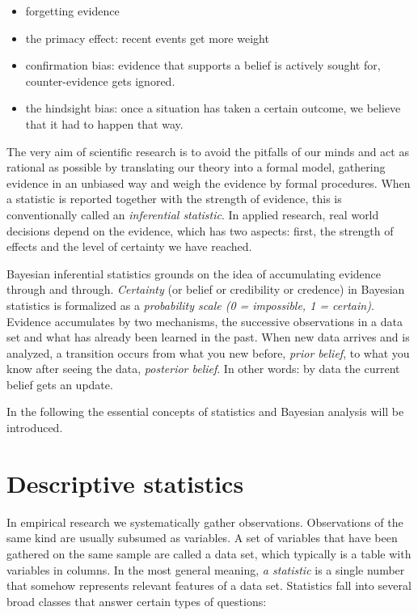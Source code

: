 \documentclass[]{svmono}
\providecommand{\tightlist}{%
  \setlength{\itemsep}{0pt}\setlength{\parskip}{0pt}}
\theoremstyle{definition}
\theoremstyle{definition}
\theoremstyle{definition}
\theoremstyle{remark}
\begin{document}
\begin{itemize}
\tightlist
\item
  forgetting evidence
\item
  the primacy effect: recent events get more weight
\item
  confirmation bias: evidence that supports a belief is actively sought
  for, counter-evidence gets ignored.
\item
  the hindsight bias: once a situation has taken a certain outcome, we
  believe that it had to happen that way.
\end{itemize}

The very aim of scientific research is to avoid the pitfalls of our
minds and act as rational as possible by translating our theory into a
formal model, gathering evidence in an unbiased way and weigh the
evidence by formal procedures. When a statistic is reported together
with the strength of evidence, this is conventionally called an
\emph{inferential statistic}. In applied research, real world decisions
depend on the evidence, which has two aspects: first, the strength of
effects and the level of certainty we have reached.

Bayesian inferential statistics grounds on the idea of accumulating
evidence through and through. \emph{Certainty} (or belief or credibility
or credence) in Bayesian statistics is formalized as a \emph{probability
scale (0 = impossible, 1 = certain)}. Evidence accumulates by two
mechanisms, the successive observations in a data set and what has
already been learned in the past. When new data arrives and is analyzed,
a transition occurs from what you new before, \emph{prior belief}, to
what you know after seeing the data, \emph{posterior belief}. In other
words: by data the current belief gets an update.

In the following the essential concepts of statistics and Bayesian
analysis will be introduced.

\section{Descriptive statistics}\label{descriptive-statistics}

In empirical research we systematically gather observations.
Observations of the same kind are usually subsumed as variables. A set
of variables that have been gathered on the same sample are called a
data set, which typically is a table with variables in columns. In the
most general meaning, \emph{a statistic} is a single number that somehow
represents relevant features of a data set. Statistics fall into several
broad classes that answer certain types of questions:
\end{document}
